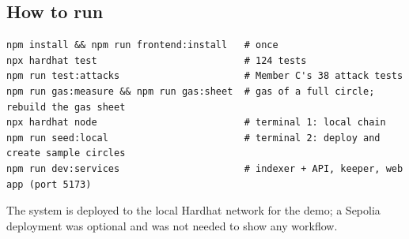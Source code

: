 \subsection{How to run}
\begin{lstlisting}[language={}]
npm install && npm run frontend:install   # once
npx hardhat test                          # 124 tests
npm run test:attacks                      # Member C's 38 attack tests
npm run gas:measure && npm run gas:sheet  # gas of a full circle; rebuild the gas sheet
npx hardhat node                          # terminal 1: local chain
npm run seed:local                        # terminal 2: deploy and create sample circles
npm run dev:services                      # indexer + API, keeper, web app (port 5173)
\end{lstlisting}
The system is deployed to the local Hardhat network for the demo; a Sepolia deployment was optional
and was not needed to show any workflow.
